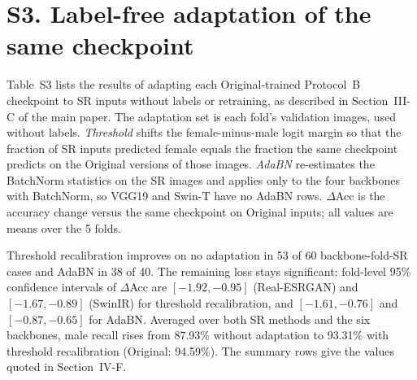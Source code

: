 \documentclass[11pt]{article}
\begin{document}
\section*{S3. Label-free adaptation of the same checkpoint}
\noindent Table~S3 lists the results of adapting each Original-trained Protocol~B checkpoint to SR inputs without labels or retraining, as described in Section~III-C of the main paper. The adaptation set is each fold's validation images, used without labels. \emph{Threshold} shifts the female-minus-male logit margin so that the fraction of SR inputs predicted female equals the fraction the same checkpoint predicts on the Original versions of those images. \emph{AdaBN} re-estimates the BatchNorm statistics on the SR images and applies only to the four backbones with BatchNorm, so VGG19 and Swin-T have no AdaBN rows. $\Delta$Acc is the accuracy change versus the same checkpoint on Original inputs; all values are means over the 5 folds.

Threshold recalibration improves on no adaptation in 53 of 60 backbone-fold-SR cases and AdaBN in 38 of 40. The remaining loss stays significant: fold-level 95\% confidence intervals of $\Delta$Acc are $[-1.92, -0.95]$ (Real-ESRGAN) and $[-1.67, -0.89]$ (SwinIR) for threshold recalibration, and $[-1.61, -0.76]$ and $[-0.87, -0.65]$ for AdaBN. Averaged over both SR methods and the six backbones, male recall rises from 87.93\% without adaptation to 93.31\% with threshold recalibration (Original: 94.59\%). The summary rows give the values quoted in Section~IV-F.
\end{document}
